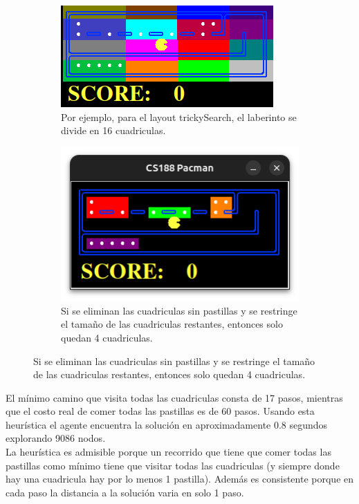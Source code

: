 \documentclass[12pt, titlepage, a4paper]{article}
\begin{document}
\begin{figure}[H]
    \begin{subfigure}{0.5\textwidth}
    \centering
    \includegraphics[width=.9\textwidth]{Imagenes/Captura desde 2025-04-09 20-07-23.png}
    \caption{Por ejemplo, para el layout trickySearch, el laberinto se divide en 16 cuadriculas.}
    \end{subfigure}%
    \begin{subfigure}[t]{0.5\textwidth}
    \centering
    \includegraphics[width=.9\textwidth]{Imagenes/image.png}
    \caption{Si se eliminan las cuadriculas sin pastillas y se restringe el tamaño de las cuadriculas restantes, entonces solo quedan 4 cuadriculas.}
    \end{subfigure}
\end{figure}




El mínimo camino que visita todas las cuadriculas consta de 17 pasos, mientras
que el costo real de comer todas las pastillas es de 60 pasos. Usando esta
heurística el agente encuentra la solución en aproximadamente 0.8 segundos
explorando 9086 nodos.\\

La heurística es admisible porque un recorrido que tiene que comer todas las
pastillas como mínimo tiene que visitar todas las cuadriculas (y siempre donde
hay una cuadricula hay por lo menos 1 pastilla). Además es consistente porque en cada paso la distancia a la solución varia en solo 1 paso.\\
\end{document}
